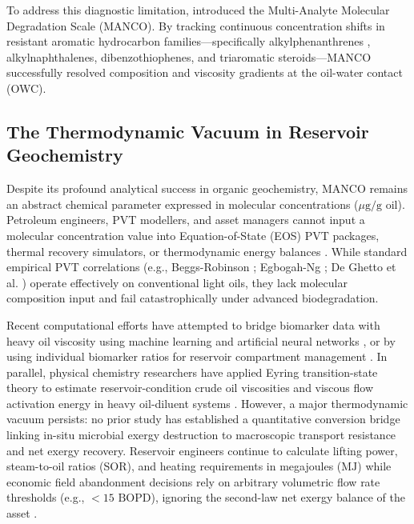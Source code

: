 \documentclass[review,12pt]{elsarticle}
\begin{document}
To address this diagnostic limitation, \citet{larter2003molecular, larter2012molecular} introduced the Multi-Analyte Molecular Degradation Scale (MANCO). By tracking continuous concentration shifts in resistant aromatic hydrocarbon families---specifically alkylphenanthrenes \citep{radke1982methylphenanthrene}, alkylnaphthalenes, dibenzothiophenes, and triaromatic steroids---MANCO successfully resolved composition and viscosity gradients at the oil-water contact (OWC). 

\subsection{The Thermodynamic Vacuum in Reservoir Geochemistry}
Despite its profound analytical success in organic geochemistry, MANCO remains an abstract chemical parameter expressed in molecular concentrations ($\mu\text{g/g oil}$). Petroleum engineers, PVT modellers, and asset managers cannot input a molecular concentration value into Equation-of-State (EOS) PVT packages, thermal recovery simulators, or thermodynamic energy balances \citep{gates2014exergy, bejan2016advanced}. While standard empirical PVT correlations (e.g., Beggs-Robinson \citeyear{beggs1975viscosity}; Egbogah-Ng \citeyear{egbogah1990improved}; De Ghetto et al. \citeyear{deghetto1995pvt}) operate effectively on conventional light oils, they lack molecular composition input and fail catastrophically under advanced biodegradation. 

Recent computational efforts have attempted to bridge biomarker data with heavy oil viscosity using machine learning and artificial neural networks \citep{zhong2025establishing, hu2014viscosity}, or by using individual biomarker ratios for reservoir compartment management \citep{mccaffrey1996using}. In parallel, physical chemistry researchers have applied Eyring transition-state theory to estimate reservoir-condition crude oil viscosities \citep{macias2009eyring} and viscous flow activation energy in heavy oil-diluent systems \citep{andrade2018eyring, miadonye2024activation}. However, a major thermodynamic vacuum persists: no prior study has established a quantitative conversion bridge linking in-situ microbial exergy destruction to macroscopic transport resistance and net exergy recovery. Reservoir engineers continue to calculate lifting power, steam-to-oil ratios (SOR), and heating requirements in megajoules ($\text{MJ}$) while economic field abandonment decisions rely on arbitrary volumetric flow rate thresholds (e.g., $< 15\text{ BOPD}$), ignoring the second-law net exergy balance of the asset \citep{kotas2013exergy}.
\end{document}
